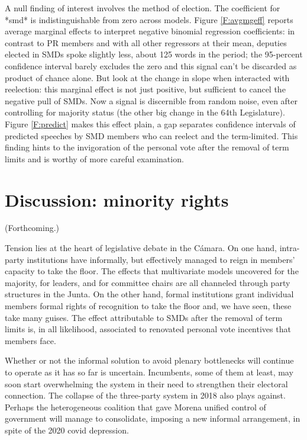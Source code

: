 \documentclass[letter,12pt]{article}
\begin{document}
A null finding of interest involves the method of election. The coefficient for *smd* is indistinguishable from zero across models. Figure \ref{F:avgmgeff} reports average marginal effects to interpret negative binomial regression coefficients: in contrast to PR members and with all other regressors at their mean, deputies elected in SMDs spoke slightly less, about 125 words in the period; the 95-percent confidence interval barely excludes the zero and this signal can't be discarded as product of chance alone. But look at the change in slope when interacted with reelection: this marginal effect is not just positive, but sufficient to cancel the negative pull of SMDs. Now a signal is discernible from random noise, even after controlling for majority status (the other big change in the 64th Legislature). Figure \ref{F:predict} makes this effect plain, a gap separates confidence intervals of predicted speeches by SMD members who can reelect and the term-limited. This finding hints to the invigoration of the personal vote after the removal of term limits and is worthy of more careful examination. 

\section{Discussion: minority rights} %


(Forthcoming.)

Tension lies at the heart of legislative debate in the Cámara. On one hand, intra-party institutions have informally, but effectively managed to reign in members' capacity to take the floor. The effects that multivariate models uncovered for the majority, for leaders, and for committee chairs are all channeled through party structures in the Junta. On the other hand, formal institutions grant individual members formal rights of recognition to take the floor and, we have seen, these take many guises. The effect attributable to SMDs after the removal of term limits is, in all likelihood, associated to renovated personal vote incentives that members face. 

Whether or not the informal solution to avoid plenary bottlenecks will continue to operate as it has so far is uncertain. Incumbents, some of them at least, may soon start overwhelming the system in their need to strengthen their electoral connection. The collapse of the three-party system in 2018 also plays against. Perhaps the heterogeneous coalition that gave Morena unified control of government will manage to consolidate, imposing a new informal arrangement, in spite of the 2020 covid depression.
\end{document}
